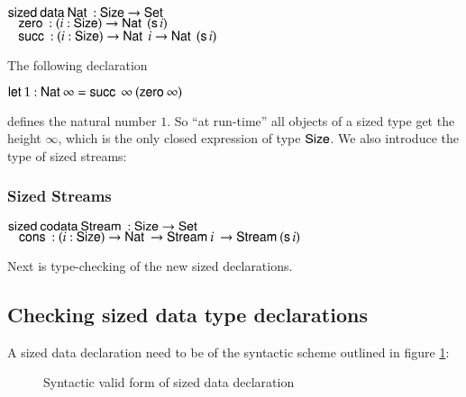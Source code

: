 \begin{bsp}
$\mathsf{sized}\: \mathsf{data}\: \mathsf{Nat}\: : \mathsf{Size} \rightarrow \mathsf{Set} $ \\
$\hspace*{3mm} \mathsf{zero}\: : ( i : \mathsf{Size} ) \rightarrow{ \mathsf{Nat}\:\: (\mathsf{s}\,i)} $\\
$\hspace*{3mm} \mathsf{succ}\: : ( i : \mathsf{Size} ) \rightarrow{ \mathsf{Nat}\:\: i \rightarrow\mathsf{Nat}\:\: (\mathsf{s}\,i)} $
\end{bsp}

\noindent The following declaration
\begin{bsp}
$\mathsf{let}\: 1 : \mathsf{Nat}\: \infty = \mathsf{succ}\: \: \infty \: (\mathsf{zero}\: \infty)$ 
\end{bsp}
\noindent defines the natural number $1$. So ``at run-time'' all objects of a sized type get the height $\infty$,
which is the only closed expression of type $\mathsf{Size}$. We also introduce the type of sized streams:
\subsubsection{Sized Streams}
\begin{bsp}
$\mathsf{sized}\: \mathsf{codata}\: \mathsf{Stream}\: : \mathsf{Size} \rightarrow \mathsf{Set} $ \\
$\hspace*{3mm} \mathsf{cons}\: : ( i : \mathsf{Size} ) \rightarrow{\mathsf{Nat}\:\rightarrow\mathsf{Stream}\:i \: \rightarrow\mathsf{Stream}\:(\mathsf{s}\,i) } $
\end{bsp}
Next is type-checking of the new sized declarations. 
\subsection{Checking sized data type declarations}

A sized data declaration need to be of the syntactic scheme outlined in figure \ref{ssyn}:

\begin{figure}[htp]
\caption{Syntactic valid form of sized data declaration}
\label{ssyn}
\end{figure}

